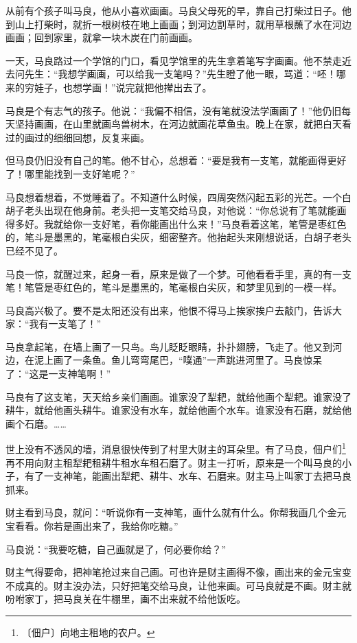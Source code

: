 \documentclass[12pt,UTF-8,openany]{ctexbook}
\begin{document}
\begin{Large}
    
    从前有个孩子叫马良，他从小喜欢画画。马良父母死的早，靠自己打柴过日子。他到山上打柴时，就折一根树枝在地上画画；到河边割草时，就用草根蘸了水在河边画画；回到家里，就拿一块木炭在门前画画。
    
    一天，马良路过一个学馆的门口，看见学馆里的先生拿着笔写字画画。他不禁走近去问先生：“我想学画画，可以给我一支笔吗？”先生瞪了他一眼，骂道：“呸！哪来的穷娃子，也想学画！”说完就把他撵出去了。
    
    马良是个有志气的孩子。他说：“我偏不相信，没有笔就没法学画画了！”他仍旧每天坚持画画，在山里就画鸟兽树木，在河边就画花草鱼虫。晚上在家，就把白天看过的画过的细细回想，反复来画。
    
    但马良仍旧没有自己的笔。他不甘心，总想着：“要是我有一支笔，就能画得更好了！哪里能找到一支好笔呢？”
    
    马良想着想着，不觉睡着了。不知道什么时候，四周突然闪起五彩的光芒。一个白胡子老头出现在他身前。老头把一支笔交给马良，对他说：“你总说有了笔就能画得多好。我就给你一支好笔，看你能画出什么来！”马良看着这笔，笔管是枣红色的，笔斗是墨黑的，笔毫根白尖灰，细密整齐。他抬起头来刚想说话，白胡子老头已经不见了。
    
    马良一惊，就醒过来，起身一看，原来是做了一个梦。可他看看手里，真的有一支笔！笔管是枣红色的，笔斗是墨黑的，笔毫根白尖灰，和梦里见到的一模一样。
    
    马良高兴极了。要不是太阳还没有出来，他恨不得马上挨家挨户去敲门，告诉大家：“我有一支笔了！”
    
    马良拿起笔，在墙上画了一只鸟。鸟儿眨眨眼睛，扑扑翅膀，飞走了。他又到河边，在泥上画了一条鱼。鱼儿弯弯尾巴，“噗通”一声跳进河里了。马良惊呆了：“这是一支神笔啊！”
    
    马良有了这支笔，天天给乡亲们画画。谁家没了犁耙，就给他画个犁耙。谁家没了耕牛，就给他画头耕牛。谁家没有水车，就给他画个水车。谁家没有石磨，就给他画个石磨。……
    
    世上没有不透风的墙，消息很快传到了村里大财主的耳朵里。有了马良，佃户们\footnote{〔佃户〕向地主租地的农户。}再不用向财主租犁耙租耕牛租水车租石磨了。财主一打听，原来是一个叫马良的小子，有了一支神笔，能画出犁耙、耕牛、水车、石磨来。财主马上叫家丁去把马良抓来。
    
    财主看到马良，就问：“听说你有一支神笔，画什么就有什么。你帮我画几个金元宝看看。你若是画出来了，我给你吃糖。”
    
    马良说：“我要吃糖，自己画就是了，何必要你给？”
    
    财主气得要命，把神笔抢过来自己画。可也许是财主画得不像，画出来的金元宝变不成真的。财主没办法，只好把笔交给马良，让他来画。可马良就是不画。财主就吩咐家丁，把马良关在牛棚里，画不出来就不给他饭吃。
    

\end{Large}
\end{document}
